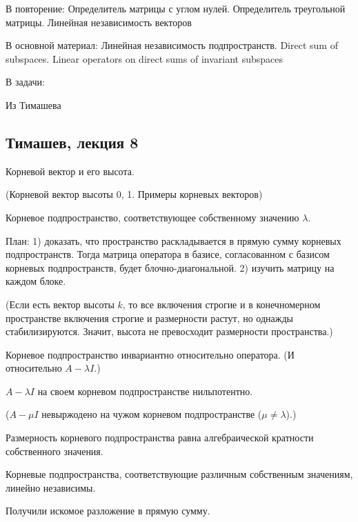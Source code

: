 В повторение:
Определитель матрицы с углом нулей.
Определитель треугольной матрицы.
Линейная независимость векторов


В основной материал:
Линейная независимость подпространств.
Direct sum of subspaces.
Linear operators on direct sums of invariant subspaces


В задачи: 


Из Тимашева
\subsection{Тимашев, лекция 8}

\begin{definition}
Корневой вектор и его высота.
\end{definition}

(Корневой вектор высоты 0, 1.
Примеры корневых векторов)

\begin{definition}
Корневое подпространство, соответствующее собственному значению $\lambda$.
\end{definition}

План: 
1) доказать, что пространство раскладывается в прямую сумму корневых подпространств. Тогда матрица оператора в базисе, согласованном с базисом корневых подпространств, будет блочно-диагональной.
2) изучить матрицу на каждом блоке.

(Если есть вектор высоты $k$, то все включения строгие и в конечномерном пространстве включения строгие и размерности растут, но однажды стабилизируются. Значит, высота не превосходит размерности пространства.)

\begin{lemma}
Корневое подпространство инвариантно относительно оператора. (И относительно $A-\lambda I$.)

$A-\lambda I$ на своем корневом подпространстве нильпотентно.

($A-\mu I$ невыржодено на чужом корневом подпространстве ($\mu \neq \lambda$).)

Размерность корневого подпространства равна алгебраической кратности собственного значения.
\end{lemma}

\begin{theorem}
    Корневые подпространства, соответствующие различным собственным значениям, линейно независимы.
\end{theorem}

\begin{corollary}
Получили искомое разложение в прямую сумму.
\end{corollary}
